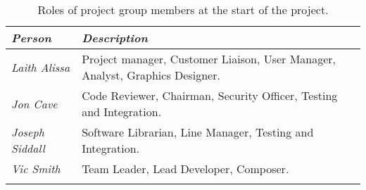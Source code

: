 \begin{table*}
	\begin{tabular}{l p{38em}}
		\toprule
		\emph{Person} & \emph{Description} \\
		\midrule
		\emph{Laith Alissa} & Project manager, Customer Liaison, User Manager, Analyst, Graphics Designer.\\[0.5em]
		\emph{Jon Cave} & Code Reviewer, Chairman, Security Officer, Testing and Integration.\\[0.5em]
		\emph{Joseph Siddall} & Software Librarian, Line Manager, Testing and Integration.\\[0.5em]
		\emph{Vic Smith} & Team Leader, Lead Developer, Composer.\\[0.5em]
		\bottomrule
		\caption{Roles of project group members at the start of the project.}
	\end{tabular}
	\label{tab:roles}
\end{table*}